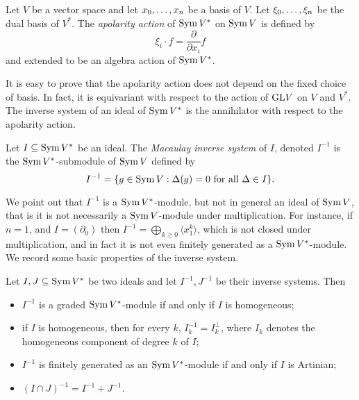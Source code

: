 \begin{definition}
\label{tensorRank-definition-apolarityAction}
Let $V$ be a vector space and let $x_0 , \ldots , x_n$ be a basis of $V$. Let $\xi_0 , \ldots , \xi_n$ be the dual basis of $V^*$. The {\it apolarity action} of $\operatorname{Sym} V^*$ on $\operatorname{Sym} V$ is defined by 
\[
\xi_i \cdot f = \frac{\partial}{\partial x_i}f
\]
and extended to be an algebra action of $\operatorname{Sym} V^*$. 
\end{definition}
It is easy to prove that the apolarity action does not depend on the fixed choice of basis. In fact, it is equivariant with respect to the action of $\mathrm{GL} V$ on $V$ and $V^*$. The inverse system of an ideal of $\operatorname{Sym} V^*$ is the annihilator with respect to the apolarity action.
\begin{definition}
 \label{apolarity-definition-inverseSystem}
 Let $I \subseteq \operatorname{Sym} V^*$ be an ideal. The {\it Macaulay inverse system} of $I$, denoted $I^{-1}$ is the $\operatorname{Sym} V^*$-submodule of $\operatorname{Sym} V$ defined by 
 \[
 I^{-1} = \{ g \in \operatorname{Sym} V : \Delta (g) = 0 \text{ for all $\Delta \in I$}\}.
 \]
\end{definition}
We point out that $ I^{-1}$ is a $\operatorname{Sym} V^*$-module, but not in general an ideal of $\operatorname{Sym} V$, that is it is not necessarily a $\operatorname{Sym} V$-module under multiplication. For instance, if $n = 1$, and $I = (\partial_0)$ then $I^{-1} = \bigoplus_{k \geq 0} \langle x_1^k \rangle$, which is not closed under multiplication, and in fact it is not even finitely generated as a $\operatorname{Sym} V^*$-module. We record some basic properties of the inverse system.
\begin{proposition}
 \label{apolarity-proposition-inverseSystemBasics}
Let $I,J \subseteq \operatorname{Sym} V^*$ be two ideals and let $I^{-1}, J^{-1}$ be their inverse systems. Then 
\begin{itemize}
 \item $I^{-1}$ is a graded $\operatorname{Sym} V^*$-module if and only if $I$ is homogeneous;
 \item if $I$ is homogeneous, then for every $k$, $I^{-1}_k = I_k^\perp$, where $I_k$ denotes the homogeneous component of degree $k$ of $I$;
 \item $I^{-1}$ is finitely generated as an $\operatorname{Sym} V^*$-module if and only if $I$ is Artinian;
 \item $(I \cap J)^{-1} = I^{-1} + J^{-1}$.
\end{itemize}
\end{proposition}

